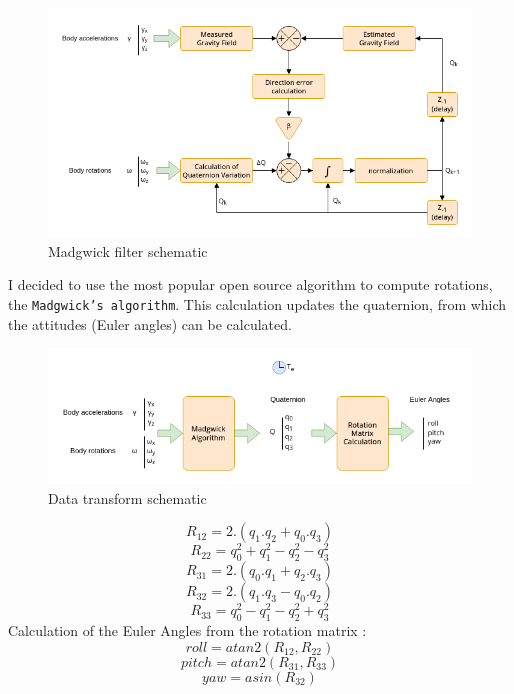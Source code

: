 \begin{figure}[H]
    \centering
    \includegraphics[width=0.9\linewidth]{./projects/pmodnav/madgwick.png}
    \caption{Madgwick filter schematic}
\end{figure}
I decided to use the most popular open source algorithm to compute rotations, the \texttt{Madgwick's algorithm}\cite{Madgwick}. This calculation updates the quaternion, from which the attitudes (Euler angles) can be calculated.
\begin{figure}[H]
    \centering
    \includegraphics[width=0.9\linewidth]{./projects/pmodnav/madgwick_applied.png}
    \caption{Data transform schematic}
\end{figure}
$$ R_{12} = 2.(q_1.q_2+q_0.q_3) $$
$$ R_{22} = q_0^2+q_1^2-q_2^2-q_3^2 $$
$$ R_{31} = 2.(q_0.q_1+q_2.q_3) $$
$$ R_{32} = 2.(q_1.q_3-q_0.q_2) $$
$$ R_{33} = q_0^2-q_1^2-q_2^2+q_3^2 $$
Calculation of the Euler Angles from the rotation matrix :
$$ roll = atan2(R_{12},R_{22}) $$
$$ pitch = atan2(R_{31},R_{33}) $$
$$ yaw = asin(R_{32}) $$


